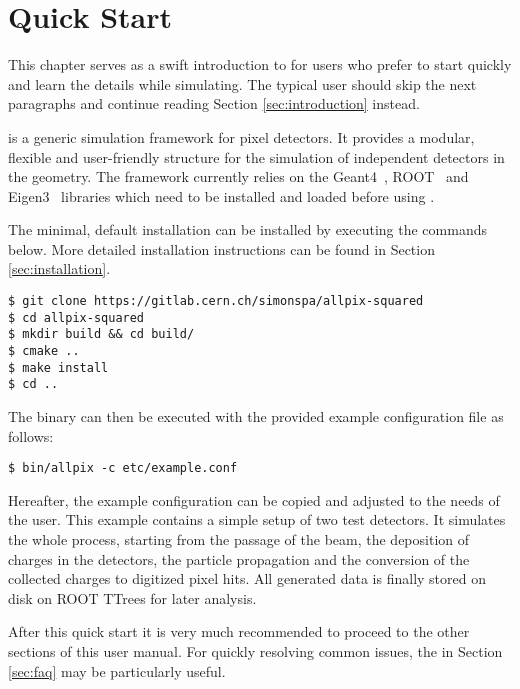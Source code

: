 \section{Quick Start}
This chapter serves as a swift introduction to \apsq for users who prefer to start quickly and learn the details while simulating.
The typical user should skip the next paragraphs and continue reading Section \ref{sec:introduction} instead. 

\apsq is a generic simulation framework for pixel detectors.
It provides a modular, flexible and user-friendly structure for the simulation of independent detectors in the geometry.
The framework currently relies on the Geant4~\cite{geant4}, ROOT~\cite{root} and Eigen3~\cite{eigen3} libraries which need to be installed and loaded before using \apsq.

The minimal, default installation can be installed by executing the commands below.
More detailed installation instructions can be found in Section \ref{sec:installation}.

\begin{verbatim}
$ git clone https://gitlab.cern.ch/simonspa/allpix-squared
$ cd allpix-squared
$ mkdir build && cd build/
$ cmake ..
$ make install
$ cd ..
\end{verbatim}
The binary can then be executed with the provided example configuration file as follows:
\begin{verbatim}
$ bin/allpix -c etc/example.conf
\end{verbatim}

Hereafter, the example configuration can be copied and adjusted to the needs of the user.
This example contains a simple setup of two test detectors.
It simulates the whole process, starting from the passage of the beam, the deposition of charges in the detectors, the particle propagation and the conversion of the collected charges to digitized pixel hits.
All generated data is finally stored on disk on ROOT TTrees for later analysis.

After this quick start it is very much recommended to proceed to the other sections of this user manual.
For quickly resolving common issues, the  in Section \ref{sec:faq} may be particularly useful.
